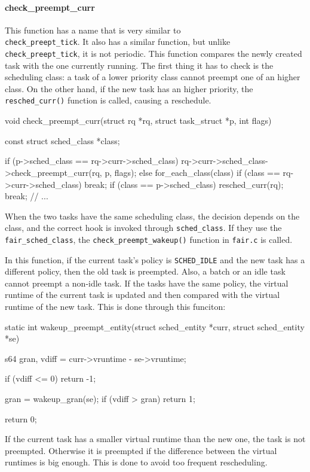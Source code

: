 \paragraph{check\_preempt\_curr}\label{check_preempt_curr}
This function has a name that is very similar to\\ \verb|check_preept_tick|. It also has a similar function, but unlike \verb|check_preept_tick|, it is not periodic.
This function compares the newly created task with the one currently running. The first thing it has to check is the scheduling class: a task of a lower priority class cannot preempt one of an higher class. On the other hand, if the new task has an higher priority, the \verb|resched_curr()| function is called, causing a reschedule.
\begin{code}
void check_preempt_curr(struct rq *rq, struct task_struct *p, int flags)
{
	const struct sched_class *class;

	if (p->sched_class == rq->curr->sched_class) {
		rq->curr->sched_class->check_preempt_curr(rq, p, flags);
	} else {
		for_each_class(class) {
			if (class == rq->curr->sched_class)
				break;
			if (class == p->sched_class) {
				resched_curr(rq);
				break;
			}
		}
	}
	// ...
}
\end{code}
When the two tasks have the same scheduling class, the decision depends on the class, and the correct hook is invoked through \verb|sched_class|. If they use the \verb|fair_sched_class|, the \verb|check_preempt_wakeup()| function in \verb|fair.c| is called.

In this function, if the current task's policy is \verb|SCHED_IDLE| and the new task has a different policy, then the old task is preempted. Also, a batch or an idle task cannot preempt a non-idle task. If the tasks have the same policy, the virtual runtime of the current task is updated and then compared with the virtual runtime of the new task. This is done through this funciton:

\begin{code}
static int
wakeup_preempt_entity(struct sched_entity *curr, struct sched_entity *se)
{
	s64 gran, vdiff = curr->vruntime - se->vruntime;

	if (vdiff <= 0)
		return -1;

	gran = wakeup_gran(se);
	if (vdiff > gran)
		return 1;

	return 0;
}
\end{code}
If the current task has a smaller virtual runtime than the new one, the task is not preempted. Otherwise it is preempted if the difference between the virtual runtimes is big enough. This is done to avoid too frequent rescheduling. 

